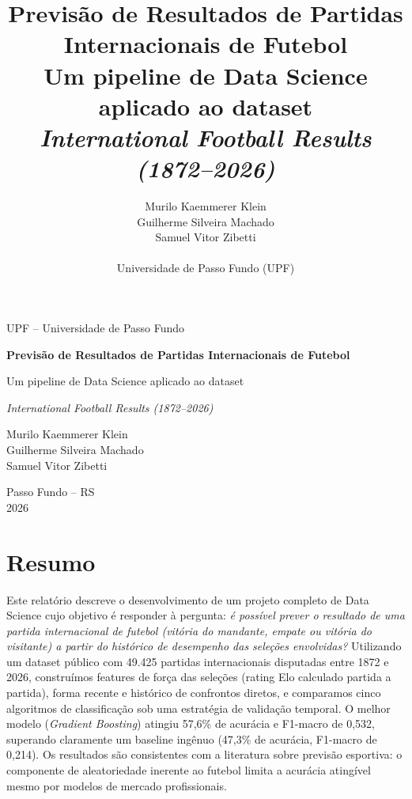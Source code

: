 \documentclass[12pt,a4paper]{article}
\title{\textbf{Previsão de Resultados de Partidas Internacionais de Futebol \\
\large Um pipeline de Data Science aplicado ao dataset \\
\textit{International Football Results (1872--2026)}}}
\author{
  Murilo Kaemmerer Klein \\
  Guilherme Silveira Machado \\
  Samuel Vitor Zibetti \\
  \\
  \small Universidade de Passo Fundo (UPF) 
}
\date{}
\begin{document}
\begin{titlepage}
\centering

{\Large UPF -- Universidade de Passo Fundo\par}

\vspace{3cm}

{\LARGE\bfseries Previsão de Resultados de Partidas Internacionais de Futebol\par}

\vspace{0.8cm}

{\large Um pipeline de Data Science aplicado ao dataset\par}

\vspace{0.3cm}

{\itshape International Football Results (1872--2026)\par}

\vfill

{\large
Murilo Kaemmerer Klein\\
Guilherme Silveira Machado\\
Samuel Vitor Zibetti
\par}

\vfill

{\large
Passo Fundo -- RS\\
2026
\par}

\end{titlepage}

\section*{Resumo}

Este relatório descreve o desenvolvimento de um projeto completo de Data Science cujo objetivo é responder à pergunta: \emph{é possível prever o resultado de uma partida internacional de futebol (vitória do mandante, empate ou vitória do visitante) a partir do histórico de desempenho das seleções envolvidas?} Utilizando um dataset público com 49.425 partidas internacionais disputadas entre 1872 e 2026, construímos features de força das seleções (rating Elo calculado partida a partida), forma recente e histórico de confrontos diretos, e comparamos cinco algoritmos de classificação sob uma estratégia de validação temporal. O melhor modelo (\emph{Gradient Boosting}) atingiu 57,6\% de acurácia e F1-macro de 0,532, superando claramente um baseline ingênuo (47,3\% de acurácia, F1-macro de 0,214). Os resultados são consistentes com a literatura sobre previsão esportiva: o componente de aleatoriedade inerente ao futebol limita a acurácia atingível mesmo por modelos de mercado profissionais.
\end{document}
